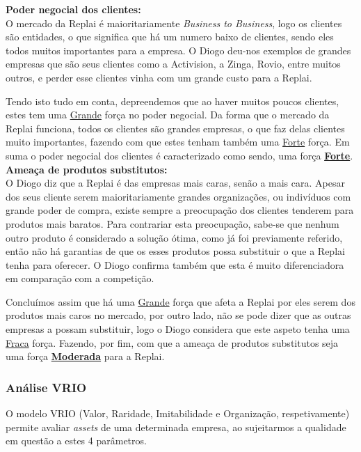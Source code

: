 \noindent\textbf{Poder negocial dos clientes:}\\

O mercado da Replai é maioritariamente \textit{Business to Business}, logo os clientes são entidades, o que significa que há um numero baixo de clientes, sendo eles todos muitos importantes para a empresa. O Diogo deu-nos exemplos de grandes empresas que são seus clientes como a Activision, a Zinga, Rovio, entre muitos outros, e perder esse clientes vinha com um grande custo para a Replai.

Tendo isto tudo em conta, depreendemos que ao haver muitos poucos clientes, estes tem uma \underline{Grande} força no poder negocial. Da forma que o mercado da Replai funciona, todos os clientes são grandes empresas, o que faz delas clientes muito importantes, fazendo com que estes tenham também uma \underline{Forte} força. Em suma o poder negocial dos clientes é caracterizado como sendo, uma força \textbf{\underline{Forte}}.\\

\noindent\textbf{Ameaça de produtos substitutos:}\\

O Diogo diz que a Replai é das empresas mais caras, senão a mais cara. Apesar dos seus cliente serem maioritariamente grandes organizações, ou indivíduos com grande poder de compra, existe sempre a preocupação dos clientes tenderem para produtos mais baratos. Para contrariar esta preocupação, sabe-se que nenhum outro produto é considerado a solução ótima, como já foi previamente referido, então não há garantias de que os esses produtos possa substituir o que a Replai tenha para oferecer. O Diogo confirma também que esta é muito diferenciadora em comparação com a competição.

Concluímos assim que há uma \underline{Grande} força que afeta a Replai por eles serem dos produtos mais caros no mercado, por outro lado, não se pode dizer que as outras empresas a possam substituir, logo o Diogo considera que este aspeto tenha uma \underline{Fraca} força. Fazendo, por fim, com que a ameaça de produtos substitutos seja uma força \textbf{\underline{Moderada}} para a Replai.\\

\newpage
\subsubsection{Análise VRIO}

O modelo VRIO (Valor, Raridade, Imitabilidade e Organização, respetivamente) permite avaliar \textit{assets} de uma determinada empresa, ao sujeitarmos a qualidade em questão a estes 4 parâmetros.
  
